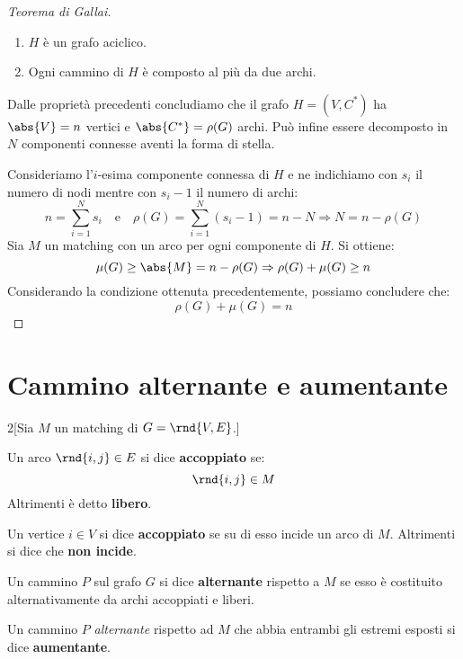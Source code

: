 \documentclass[\main/main.tex]{subfiles}
\begin{document}
\begin{proof}[Teorema di Gallai]
	\begin{enumerate}
		\item \(H\) è un grafo aciclico.
		\item Ogni cammino di \(H\) è composto al più da due archi.
	\end{enumerate}

	Dalle proprietà precedenti concludiamo che il grafo \(H = (V, C^*)\) ha \(\abs{V} = n\) vertici e \(\abs{C^*} = \rho(G)\) archi. Può infine essere decomposto in \(N\) componenti connesse aventi la forma di stella.

	Consideriamo l'\(i\)-esima componente connessa di \(H\) e ne indichiamo con \(s_i\) il numero di nodi mentre con \(s_i-1\) il numero di archi:
	\[
		n = \sum_{i=1}^N s_i \quad \text{e} \quad \rho(G) = \sum_{i=1}^N (s_i -1) = n - N \Rightarrow N = n - \rho(G)
	\]
	Sia \(M\) un matching con un arco per ogni componente di \(H\). Si ottiene:
	\[
		\mu(G) \geq \abs{M} = n - \rho(G) \Rightarrow \rho(G) + \mu(G) \geq n
	\]
	Considerando la condizione ottenuta precedentemente, possiamo concludere che:
	\[
		\rho(G) + \mu(G) = n
	\]

\end{proof}
\clearpage
\section{Cammino alternante e aumentante}
\begin{multicols}{2}[Sia \(M\) un matching di \(G = \rnd{V, E}\).]
	\begin{definition}
		Un arco \(\rnd{i,j} \in E\) si dice \textbf{accoppiato} se:
		\[
			\rnd{i,j} \in M
		\]
		Altrimenti è detto \textbf{libero}.
	\end{definition}
	\begin{definition}
		Un vertice \(i \in V\) si dice \textbf{accoppiato} se su di esso incide un arco di \(M\). Altrimenti si dice che \textbf{non incide}.
	\end{definition}
	\begin{definition}
		Un cammino \(P\) sul grafo \(G\) si dice \textbf{alternante} rispetto a \(M\) se esso è costituito alternativamente da archi accoppiati e liberi.
	\end{definition}
	\begin{definition}
		Un cammino \(P\) \textit{alternante} rispetto ad \(M\) che abbia entrambi gli estremi esposti si dice \textbf{aumentante}.
	\end{definition}
\end{multicols}
\end{document}
